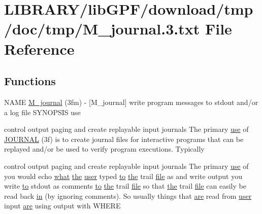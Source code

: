 \hypertarget{M__journal_83_8txt}{}\section{L\+I\+B\+R\+A\+R\+Y/lib\+G\+P\+F/download/tmp/doc/tmp/\+M\+\_\+journal.3.txt File Reference}
\label{M__journal_83_8txt}
\subsection*{Functions}
\begin{DoxyCompactItemize}
\item 
N\+A\+ME \hyperlink{M__journal_83_8txt_afbce2a0c3f8261fe1c9d79376919174e}{M\+\_\+journal} (3fm) -\/ \mbox{[}\+M\+\_\+journal\mbox{]} write program messages to stdout and/or a log file S\+Y\+N\+O\+P\+S\+I\+S use
\item 
control output paging and create replayable input journals The primary \hyperlink{intro__blas1_83_8txt_a04fa2694d85f67a675bb3f45f7241f48}{use} of \hyperlink{M__journal_83_8txt_aee6db01e1c6132b5b3f146b5a0c6e7e1}{J\+O\+U\+R\+N\+AL} (3f) is to create journal files for interactive programs that can be replayed and/or be used to verify program executions. Typically
\item 
control output paging and create replayable input journals The primary \hyperlink{intro__blas1_83_8txt_a04fa2694d85f67a675bb3f45f7241f48}{use} of you would echo \hyperlink{what__overview_81_8txt_adadc702e2a3423fa136bfa5b1e01b511}{what} \hyperlink{M__stopwatch_83_8txt_a0f266597de2e57eb3aa964927bb30e14}{the} \hyperlink{M__stopwatch_83_8txt_ae5f4c36a1ae7eba7900823c418223f72}{user} typed \hyperlink{M__stopwatch_83_8txt_a97209fd3e34ef701c0a9734280779cbb}{to} \hyperlink{M__stopwatch_83_8txt_a0f266597de2e57eb3aa964927bb30e14}{the} trail \hyperlink{what__overview_81_8txt_a447b56c526e8da30e0dc94673727ee25}{file} as and write output you write \hyperlink{M__stopwatch_83_8txt_a97209fd3e34ef701c0a9734280779cbb}{to} stdout as comments \hyperlink{M__stopwatch_83_8txt_a97209fd3e34ef701c0a9734280779cbb}{to} \hyperlink{M__stopwatch_83_8txt_a0f266597de2e57eb3aa964927bb30e14}{the} trail \hyperlink{what__overview_81_8txt_a447b56c526e8da30e0dc94673727ee25}{file} so that \hyperlink{M__stopwatch_83_8txt_a0f266597de2e57eb3aa964927bb30e14}{the} trail \hyperlink{what__overview_81_8txt_a447b56c526e8da30e0dc94673727ee25}{file} can easily be read back \hyperlink{M__journal_83_8txt_afce72651d1eed785a2132bee863b2f38}{in} (by ignoring comments). So usually things that \hyperlink{M__stopwatch_83_8txt_a5040be02b832eba08820289c8a1f81c4}{are} read from \hyperlink{M__stopwatch_83_8txt_ae5f4c36a1ae7eba7900823c418223f72}{user} input \hyperlink{M__stopwatch_83_8txt_a5040be02b832eba08820289c8a1f81c4}{are} using output with W\+H\+E\+RE
\end{DoxyCompactItemize}

